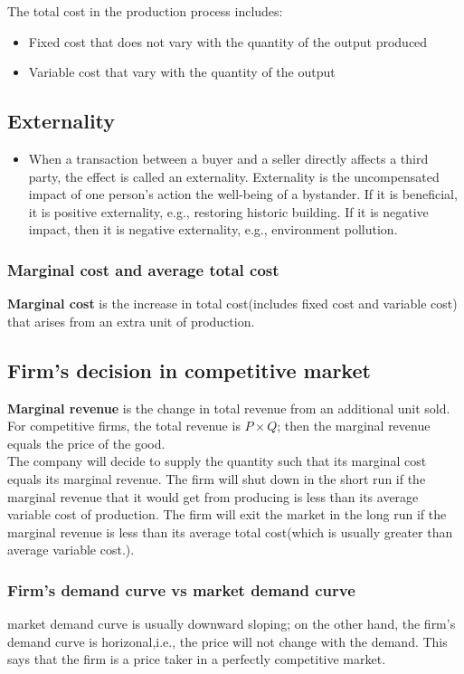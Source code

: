 \documentclass[a4paper,13pt]{report}
\begin{document}
The total cost in the production process includes:
\begin{itemize}
\item Fixed cost that does not vary with the quantity of the output produced
\item Variable cost that vary with the quantity of the output
\end{itemize}

\subsection{Externality}
\begin{itemize}
    \item When a transaction between a buyer and a seller directly affects a third party, the effect is called an externality. Externality is the uncompensated impact of one person's action the well-being of a bystander. If it is beneficial, it is positive externality, e.g., restoring historic building. If it is negative impact, then it is negative externality, e.g., environment pollution. 
\end{itemize}



\subsubsection{Marginal cost and average total cost}
\textbf{Marginal cost} is the increase in total cost(includes fixed cost and variable cost) that arises from an extra unit of production.


\subsection{Firm's decision in competitive market}
\textbf{Marginal revenue} is the change in total revenue from an additional unit sold. For competitive firms, the total revenue is $P\times Q$; then the marginal revenue equals the price of the good.\\
The company will decide to supply the quantity such that its marginal cost equals its marginal revenue. 
The firm will shut down in the short run if the marginal revenue that it would get from producing is less than its average variable cost of production. 
The firm will exit the market in the long run if the marginal revenue is less than its average total cost(which is usually greater than average variable cost.).

\subsubsection{Firm's demand curve vs market demand curve}
market demand curve is usually downward sloping; on the other hand, the firm's demand curve is horizonal,i.e., the price will not change with the demand. This says that the firm is a price taker in a perfectly competitive market. 
\end{document}
